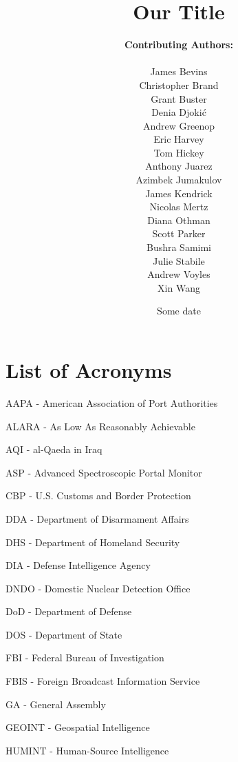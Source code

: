 \documentclass{report}
\title{Our Title}
\date{Some date}
\author{\textbf{Contributing Authors:}\\ \\
James	Bevins\\
Christopher	Brand \\
Grant	Buster\\
Denia	Djoki\'{c}\\
Andrew	Greenop\\
Eric	Harvey\\
Tom	Hickey\\
Anthony	Juarez\\
Azimbek	Jumakulov \\
James	Kendrick\\
Nicolas	Mertz \\
Diana	Othman \\
Scott	Parker \\
Bushra	Samimi \\
Julie	Stabile\\
Andrew	Voyles\\
Xin	Wang
}
\begin{document}
% 
% 
% 
% 
% 


\begin{titlepage}
\maketitle
\thispagestyle{empty}
\end{titlepage}

\pagestyle{fancyTOC}


\tableofcontents
\pagestyle{fancyTOC}




\listoffigures
\thispagestyle{fancyTOC}


\listoftables
\thispagestyle{fancyTOC}

\newpage


\pagestyle{fancyacronym}

\chapter*{List of Acronyms}
\pagestyle{fancyacronym}

AAPA - American Association of Port Authorities

ALARA - As Low As Reasonably Achievable

AQI -  al-Qaeda in Iraq

ASP - Advanced Spectroscopic Portal Monitor

CBP - U.S. Customs and Border Protection

DDA - Department of Disarmament Affairs

DHS - Department of Homeland Security

DIA - Defense Intelligence Agency

DNDO - Domestic Nuclear Detection Office

DoD - Department of Defense

DOS - Department of State

FBI - Federal Bureau of Investigation

FBIS - Foreign Broadcast Information Service

GA - General Assembly

GEOINT - Geospatial Intelligence

HUMINT - Human-Source Intelligence
\end{document}
